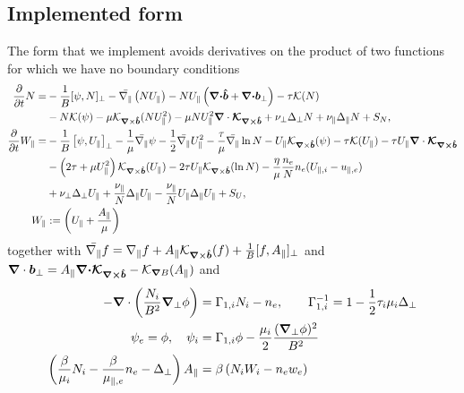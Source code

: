 \subsection{Implemented form}
The form that we implement avoids derivatives on the product of
two functions for which we have no boundary conditions
\begin{subequations}
    \begin{align}
    \frac{\partial}{\partial t} N =&
        - \frac{1}{B}[\psi, N]_{\perp}%
        - \bar \npar \left( NU_\parallel\right)
        - NU_\parallel\left(\vec \nc\bhat+\vec \nc{\vec b}_\perp\right)
        - \tau \mathcal K(N) \nonumber \\&
        - N \mathcal K(\psi)
        -\mu \mathcal K_{\vn\times\bhat}(NU_\parallel^2)
        -\mu NU_\parallel^2\nc \vec{ \mathcal K_{\vn\times\bhat}}
        + \nu_\perp\Delta_\perp N + \nu_\parallel \Delta_\parallel N + S_N, \\
    \frac{\partial}{\partial t} W_\parallel =&
        - \frac{1}{B}\left[\psi, U_\parallel\right]_{\perp}%
        - \frac{1}{\mu} \bar \npar \psi%
        - \frac{1}{2}\bar \npar U_\parallel^2
        -\frac{\tau}{\mu} \bar \npar \ln N
        - U_\parallel\mathcal K_{\vn\times\bhat}(\psi)
        - \tau \mathcal K(U_\parallel)
        -\tau U_\parallel\nc\vec{ \mathcal K_{\vn\times\bhat}}\nonumber\\&
        - \left(2\tau + {\mu}U_\parallel^2\right) \mathcal K_{\vn\times\bhat} (U_\parallel)
        -2\tau U_\parallel\mathcal K_{\vn\times\bhat}(\ln N)
        - \frac{\eta}{\mu} \frac{n_e}{N}n_e(U_{\parallel,i} - u_{\parallel,e}) \nonumber\\&
        + \nu_\perp\Delta_\perp U_\parallel
        + \frac{\nu_\parallel}{N} \Delta_\parallel U_\parallel - \frac{\nu_\parallel}{N} U_\parallel \Delta_\parallel U_\parallel
        + S_U,
        \label{eq:EgyrofluidU} \\
        W_\parallel&:= \left( U_\parallel + \frac{A_\parallel}{\mu}\right)
    \end{align}
    \label{eq:Egyrofluid}
\end{subequations}
together with
$\bar{\nabla_\parallel} f = \nabla_\parallel f + A_\parallel \mathcal K_{{\boldsymbol{\nabla}}\times\bm{\hat{b}}}(f) + \frac{1}{B}[ f, A_\parallel]_\perp$
and ${\boldsymbol{\nabla}}\cdot { {\boldsymbol{b}}}_\perp = A_\parallel {\boldsymbol{{\boldsymbol{\nabla}}\cdot}}{\boldsymbol{ \mathcal{ K}_{{\boldsymbol{\nabla}}\times\bm{\hat{b}}}}} - \mathcal K_{{\boldsymbol{\nabla}} B}(A_\parallel) $
and
\begin{subequations} \label{eq:elliptic}
  \begin{align}
    -{\boldsymbol{\nabla}}\cdot\left( \frac{N_i}{B^2}{\boldsymbol{\nabla}}_{\perp} \phi \right) &= \Gamma_{1,i} N_i - n_e, \quad\quad
    \Gamma_{1,i}^{-1} = 1-\frac{1}{2}\tau_i\mu_i \Delta_\perp \\
    \psi_e = \phi, \quad \psi_i &= \Gamma_{1,i}\phi -\frac{\mu_i}{2}\frac{({\boldsymbol{\nabla}}_{\perp}\phi)^2}{B^2} \\
    \left(\frac{\beta}{\mu_i}N_i - \frac{\beta}{\mu_{\parallel,e}}n_e-\Delta_\perp\right)
    A_\parallel &= \beta\left(N_iW_i-n_e w_e\right)
  \end{align}
\end{subequations}
